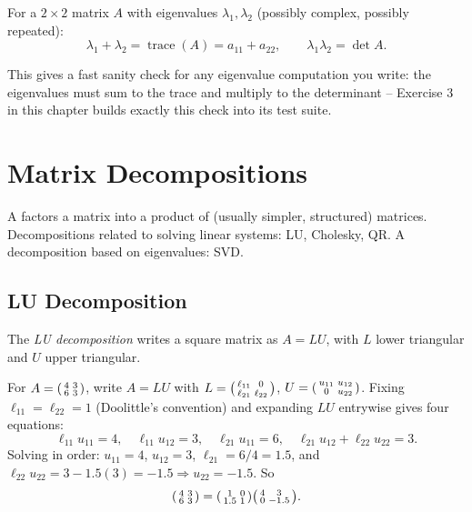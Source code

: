 \documentclass[11pt]{article}
\begin{document}
\begin{theorem}
For a $2\times 2$ matrix $A$ with eigenvalues $\lambda_1, \lambda_2$
(possibly complex, possibly repeated):
\[
  \lambda_1 + \lambda_2 = \operatorname{trace}(A) = a_{11}+a_{22},
  \qquad
  \lambda_1 \lambda_2 = \det A.
\]
\end{theorem}
This gives a fast sanity check for any eigenvalue computation you write:
the eigenvalues must sum to the trace and multiply to the determinant --
Exercise 3 in this chapter builds exactly this check into its test suite.

\section{Matrix Decompositions}

A  factors a matrix into a product of
(usually simpler, structured) matrices. Decompositions related to solving
linear systems: LU, Cholesky, QR. A decomposition based on eigenvalues:
SVD.

\subsection{LU Decomposition}

\begin{definition}
The \emph{LU decomposition} writes a square matrix as $A = LU$, with $L$
lower triangular and $U$ upper triangular.
\end{definition}

\begin{example}
For $A = \begin{psmallmatrix}4&3\\6&3\end{psmallmatrix}$, write $A = LU$
with $L = \begin{psmallmatrix}\ell_{11}&0\\\ell_{21}&\ell_{22}
\end{psmallmatrix}$, $U = \begin{psmallmatrix}u_{11}&u_{12}\\0&u_{22}
\end{psmallmatrix}$. Fixing $\ell_{11}=\ell_{22}=1$ (Doolittle's
convention) and expanding $LU$ entrywise gives four equations:
\[
  \ell_{11}u_{11} = 4,\quad \ell_{11}u_{12} = 3,\quad
  \ell_{21}u_{11} = 6,\quad \ell_{21}u_{12} + \ell_{22}u_{22} = 3.
\]
Solving in order: $u_{11} = 4$, $u_{12} = 3$, $\ell_{21} = 6/4 = 1.5$, and
$\ell_{22}u_{22} = 3 - 1.5(3) = -1.5 \Rightarrow u_{22} = -1.5$. So
\[
  \begin{psmallmatrix}4&3\\6&3\end{psmallmatrix} =
  \begin{psmallmatrix}1&0\\1.5&1\end{psmallmatrix}
  \begin{psmallmatrix}4&3\\0&-1.5\end{psmallmatrix}.
\]
\end{example}
\end{document}
